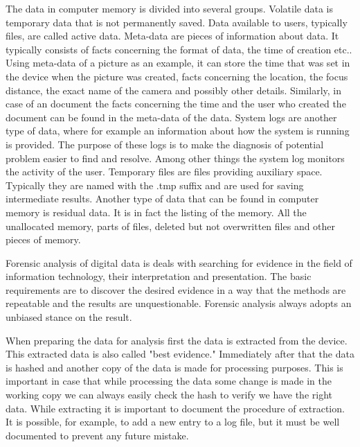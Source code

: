 The data in computer memory is divided into several groups. Volatile data is temporary data that is not permanently saved. Data available to users, typically files, are called active data. Meta-data are pieces of information about data. It typically consists of facts concerning the format of data, the time of creation etc.. Using meta-data of a picture as an example, it can store the time that was set in the device when the picture was created, facts concerning the location, the focus distance, the exact name of the camera and possibly other details. Similarly, in case of an document the facts concerning the time and the user who created the document can be found in the meta-data of the data. System logs are another type of data, where for example an information about how the system is running is provided. The purpose of these logs is to make the diagnosis of potential problem easier to find and resolve. Among other things the system log monitors the activity of the user. Temporary files are files providing auxiliary space. Typically they are named with the .tmp suffix and are used for saving intermediate results. Another type of data that can be found in computer memory is residual data. It is in fact the listing of the memory. All the unallocated memory, parts of files, deleted but not overwritten files and other pieces of memory.


Forensic analysis of digital data is deals with searching for evidence in the field of information technology, their interpretation and presentation. The basic requirements are to discover the desired evidence in a way that the methods are repeatable and the results are unquestionable. Forensic analysis always adopts an unbiased stance on the result.

When preparing the data for analysis first the data is extracted from the device. This extracted data is also called "best evidence." Immediately after that the data is hashed and another copy of the data is made for processing purposes. This is important in case that while processing the data some change is made in the working copy we can always easily check the hash to verify we have the right data. While extracting it is important to document the procedure of extraction. It is possible, for example, to add a new entry to a log file, but it must be well documented to prevent any future mistake.


%
%
%
%
%
%
% 	

